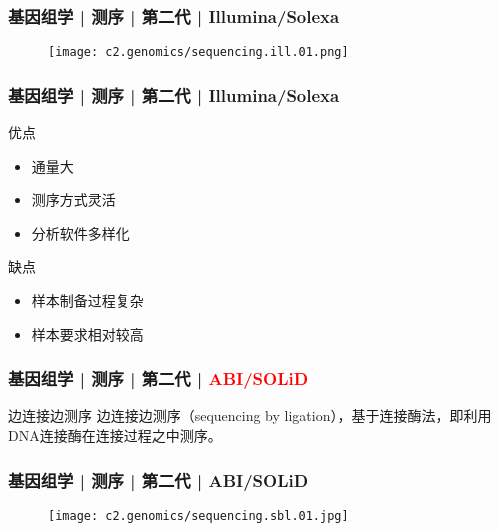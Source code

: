 \begin{frame}
  \frametitle{基因组学 | 测序 | 第二代 | Illumina/Solexa}
  \begin{figure}
    \centering
    \texttt{[image: c2.genomics/sequencing.ill.01.png]}
  \end{figure}
\end{frame}

\begin{frame}
  \frametitle{基因组学 | 测序 | 第二代 | Illumina/Solexa}
  \begin{block}{优点}
    \begin{itemize}
      \item 通量大
      \item 测序方式灵活
      \item 分析软件多样化
    \end{itemize}
  \end{block}
  \pause
  \begin{block}{缺点}
    \begin{itemize}
      \item 样本制备过程复杂
      \item 样本要求相对较高
    \end{itemize}
  \end{block}
\end{frame}

\begin{frame}
  \frametitle{基因组学 | 测序 | 第二代 | \textcolor{red}{ABI/SOLiD}}
  \begin{block}{边连接边测序}
边连接边测序（sequencing by ligation），基于连接酶法，即利用DNA连接酶在连接过程之中测序。  
  \end{block}
\end{frame}

\begin{frame}
  \frametitle{基因组学 | 测序 | 第二代 | ABI/SOLiD}
  \begin{figure}
    \centering
    \texttt{[image: c2.genomics/sequencing.sbl.01.jpg]}
  \end{figure}
\end{frame}

